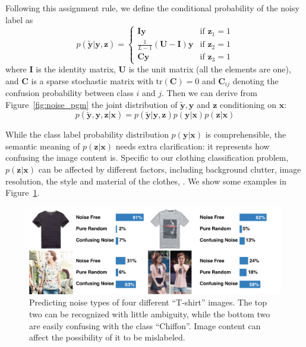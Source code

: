 \documentclass[10pt,twocolumn,letterpaper]{article}
\def\vec{\mathbf}
\def\mat{\mathbf}
\begin{document}
Following this assignment rule, we define the conditional probability of the noisy label as
\begin{equation} \label{eq:likelihood}
    p(\tilde{\vec{y}}|\vec{y},\vec{z}) = \begin{cases}
        \mat{I}\vec{y} & \text{if } \vec{z}_1 = 1 \\
        \frac{1}{L-1}(\mat{U} - \mat{I})\vec{y} & \text{if } \vec{z}_2 = 1 \\
        \mat{C}\vec{y} & \text{if } \vec{z}_3 = 1
    \end{cases}
\end{equation}
where $\mat{I}$ is the identity matrix, $\mat{U}$ is the unit matrix (all the elements are one), and $\mat{C}$ is a sparse stochastic matrix with $\mathrm{tr}(\mat{C})=0$ and $\mat{C}_{ij}$ denoting the confusion probability between class $i$ and $j$. Then we can derive from Figure~\ref{fig:noise_pgm} the joint distribution of $\tilde{\vec{y}}, \vec{y}$ and $\vec{z}$ conditioning on $\vec{x}$:
\begin{equation} \label{eq:joint_distribution}
  p(\tilde{\vec{y}}, \vec{y}, \vec{z} | \vec{x}) = p(\tilde{\vec{y}} | \vec{y}, \vec{z}) p(\vec{y} | \vec{x}) p(\vec{z} | \vec{x})
\end{equation}

While the class label probability distribution $p(\vec{y} | \vec{x})$ is comprehensible, the semantic meaning of $p(\vec{z} | \vec{x})$ needs extra clarification: it represents how confusing the image content is. Specific to our clothing classification problem, $p(\vec{z} | \vec{x})$ can be affected by different factors, including background clutter, image resolution, the style and material of the clothes, \etc. We show some examples in Figure~\ref{fig:compare_noise_level}.

\begin{figure}[t]
\begin{center}
\includegraphics[width=1.0\linewidth]{figure/noise_level.pdf}
\end{center}
\caption{Predicting noise types of four different ``T-shirt'' images. The top two can be recognized with little ambiguity, while the bottom two are easily confusing with the class ``Chiffon''. Image content can affect the possibility of it to be mislabeled.}
\label{fig:compare_noise_level}
\end{figure}
\end{document}
